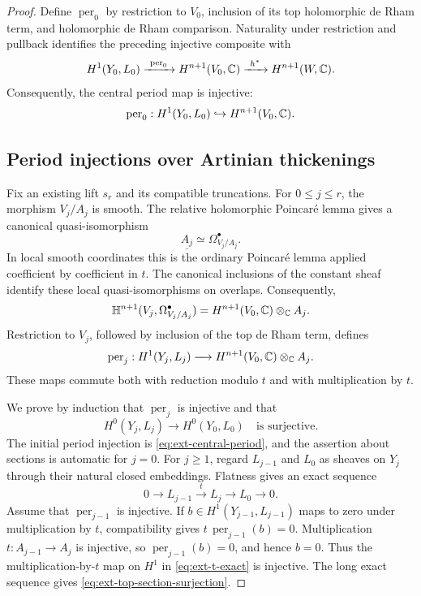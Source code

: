 \documentclass[11pt,a4paper]{article}
\theoremstyle{definition}\newtheorem{definition}[theorem]{Definition}
\theoremstyle{remark}\newtheorem*{remark}{Remark}
\newcommand{\per}{\operatorname{per}}\newcommand{\Tr}{\operatorname{Tr}}
\begin{document}
\begin{proof}
Define $\per_0$ by restriction to $V_0$, inclusion of its top
holomorphic de Rham term, and holomorphic de Rham comparison.
Naturality under restriction and pullback identifies the preceding
injective composite with
\[
 H^1(Y_0,L_0)\xrightarrow{\ \per_0\ }
 H^{n+1}(V_0,\C)\xrightarrow{\ h^*\ }H^{n+1}(W,\C).
\]
Consequently, the central period map is injective:
\begin{equation}\label{eq:ext-central-period}
 \per_0:H^1(Y_0,L_0)\hookrightarrow H^{n+1}(V_0,\C).
\end{equation}

\subsection{Period injections over Artinian thickenings}

Fix an existing lift $s_r$ and its compatible truncations.
For $0\le j\le r$, the morphism $V_j/A_j$ is smooth.
The relative holomorphic Poincaré lemma gives a canonical
quasi-isomorphism
\[
 \underline{A_j}\simeq \Omega^\bullet_{V_j/A_j}.
\]
In local smooth coordinates this is the ordinary Poincaré lemma applied
coefficient by coefficient in $t$. The canonical inclusions of the constant
sheaf identify these local quasi-isomorphisms on overlaps. Consequently,
\[
 \mathbb H^{n+1}(V_j,\Omega^\bullet_{V_j/A_j})
 =H^{n+1}(V_0,\mathbb C)\otimes_\mathbb C A_j.
\]
Restriction to $V_j$, followed by inclusion of the top de Rham term,
defines
\begin{equation}\label{eq:ext-artin-period}
 \per_j:H^1(Y_j,L_j)\longrightarrow H^{n+1}(V_0,\C)\otimes_\C A_j.
\end{equation}
These maps commute both with reduction modulo $t$ and with multiplication
by $t$.

We prove by induction that $\per_j$ is injective and that
\begin{equation}\label{eq:ext-top-section-surjection}
 H^0(Y_j,L_j)\longrightarrow H^0(Y_0,L_0)
 \quad\text{is surjective}.
\end{equation}
The initial period injection is \eqref{eq:ext-central-period}, and the
assertion about sections is automatic for $j=0$.
For $j\ge1$, regard $L_{j-1}$ and $L_0$ as sheaves on $Y_j$ through
their natural closed embeddings. Flatness gives an exact sequence
\begin{equation}\label{eq:ext-t-exact}
 0\longrightarrow L_{j-1}\xrightarrow{\ t\ }L_j
 \longrightarrow L_0\longrightarrow0.
\end{equation}
Assume that $\per_{j-1}$ is injective.
If $b\in H^1(Y_{j-1},L_{j-1})$ maps to zero under multiplication by $t$,
compatibility gives $t\,\per_{j-1}(b)=0$.
Multiplication $t:A_{j-1}\to A_j$ is injective, so
$\per_{j-1}(b)=0$, and hence $b=0$.
Thus the multiplication-by-$t$ map on $H^1$ in
\eqref{eq:ext-t-exact} is injective. The long exact sequence gives
\eqref{eq:ext-top-section-surjection}.


\end{proof}
\end{document}
